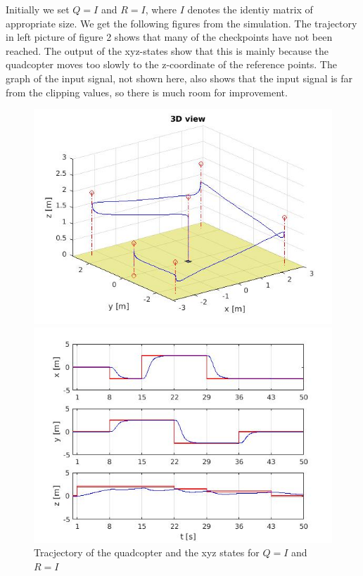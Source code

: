 \documentclass[]{article}
\begin{document}
Initially we set $Q = I$ and $R = I$, where $I$ denotes the identiy matrix of appropriate size. We get the following figures from the simulation. The trajectory in left picture of figure 2 shows that many of the checkpoints have not been reached. The output of the xyz-states show that this is mainly because the quadcopter moves too slowly to the z-coordinate of the reference points. The graph of the input signal, not shown here, also shows that the input signal is far from the clipping values, so there is much room for improvement.
\begin{figure}[H]
\begin{minipage}{.5\textwidth}
\includegraphics[width=\textwidth]{trajectory1.jpg}
\end{minipage}%
\begin{minipage}{.5\textwidth}
\includegraphics[width=\textwidth]{xyz1.jpg}
\end{minipage}
\caption{Tracjectory of the quadcopter and the xyz states for $Q = I$ and $R = I$}
\end{figure}
\end{document}
